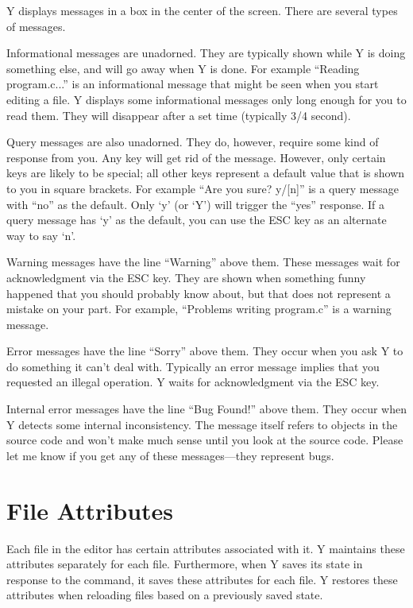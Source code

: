 Y displays messages in a box in the center of the screen. There are several types of messages.

Informational messages are unadorned. They are typically shown while Y is doing something else,
and will go away when Y is done. For example ``Reading program.c...'' is an informational
message that might be seen when you start editing a file. Y displays some informational messages
only long enough for you to read them. They will disappear after a set time (typically 3/4
second).

Query messages are also unadorned. They do, however, require some kind of response from you. Any
key will get rid of the message. However, only certain keys are likely to be special; all other
keys represent a default value that is shown to you in square brackets. For example ``Are you
sure? y/[n]'' is a query message with ``no'' as the default. Only `y' (or `Y') will trigger the
``yes'' response. If a query message has `y' as the default, you can use the ESC key as an
alternate way to say `n'.

Warning messages have the line ``Warning'' above them. These messages wait for acknowledgment
via the ESC key. They are shown when something funny happened that you should probably know
about, but that does not represent a mistake on your part. For example, ``Problems writing
program.c'' is a warning message.

Error messages have the line ``Sorry'' above them. They occur when you ask Y to do something it
can't deal with. Typically an error message implies that you requested an illegal operation. Y
waits for acknowledgment via the ESC key.

Internal error messages have the line ``Bug Found!'' above them. They occur when Y detects some
internal inconsistency. The message itself refers to objects in the source code and won't make
much sense until you look at the source code. Please let me know if you get any of these
messages---they represent bugs.

\section{File Attributes}

Each file in the editor has certain attributes associated with it. Y maintains these attributes
separately for each file. Furthermore, when Y saves its state in response to the 
command, it saves these attributes for each file. Y restores these attributes when reloading
files based on a previously saved state.

